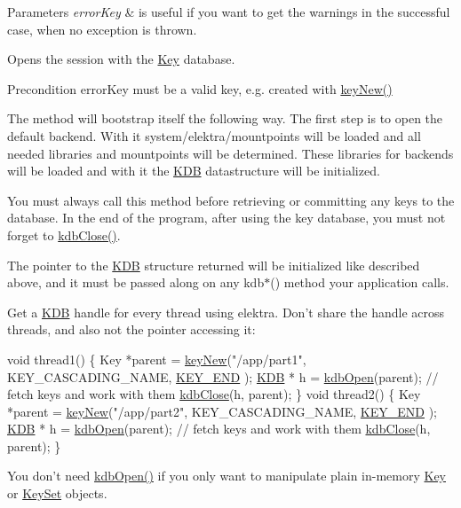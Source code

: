 \begin{DoxyParams}{Parameters}
{\em error\-Key} & is useful if you want to get the warnings in the successful case, when no exception is thrown.\\
\hline
\end{DoxyParams}
Opens the session with the \hyperlink{classkdb_1_1Key}{Key} database.  \begin{DoxyPrecond}{Precondition}
error\-Key must be a valid key, e.\-g. created with \hyperlink{group__key_gad23c65b44bf48d773759e1f9a4d43b89}{key\-New()}
\end{DoxyPrecond}
The method will bootstrap itself the following way. The first step is to open the default backend. With it system/elektra/mountpoints will be loaded and all needed libraries and mountpoints will be determined. These libraries for backends will be loaded and with it the {\ttfamily \hyperlink{classkdb_1_1KDB}{K\-D\-B}} datastructure will be initialized.

You must always call this method before retrieving or committing any keys to the database. In the end of the program, after using the key database, you must not forget to \hyperlink{group__kdb_gadb54dc9fda17ee07deb9444df745c96f}{kdb\-Close()}.

The pointer to the {\ttfamily \hyperlink{classkdb_1_1KDB}{K\-D\-B}} structure returned will be initialized like described above, and it must be passed along on any kdb$\ast$() method your application calls.

Get a {\ttfamily \hyperlink{classkdb_1_1KDB}{K\-D\-B}} handle for every thread using elektra. Don't share the handle across threads, and also not the pointer accessing it\-:


\begin{DoxyCodeInclude}
\textcolor{keywordtype}{void} thread1()
\{
        Key *parent = \hyperlink{group__key_gad23c65b44bf48d773759e1f9a4d43b89}{keyNew}(\textcolor{stringliteral}{"/app/part1"}, KEY\_CASCADING\_NAME, \hyperlink{group__key_gga91fb3178848bd682000958089abbaf40aa8adb6fcb92dec58fb19410eacfdd403}{KEY\_END}
      );
        \hyperlink{classkdb_1_1KDB_a7e0637995ce9f294cdbc6f167df6db40}{KDB} * h = \hyperlink{group__kdb_ga6808defe5870f328dd17910aacbdc6ca}{kdbOpen}(parent);
        \textcolor{comment}{// fetch keys and work with them}
        \hyperlink{group__kdb_gadb54dc9fda17ee07deb9444df745c96f}{kdbClose}(h, parent);
\}
\textcolor{keywordtype}{void} thread2()
\{
        Key *parent = \hyperlink{group__key_gad23c65b44bf48d773759e1f9a4d43b89}{keyNew}(\textcolor{stringliteral}{"/app/part2"}, KEY\_CASCADING\_NAME, \hyperlink{group__key_gga91fb3178848bd682000958089abbaf40aa8adb6fcb92dec58fb19410eacfdd403}{KEY\_END}
      );
        \hyperlink{classkdb_1_1KDB_a7e0637995ce9f294cdbc6f167df6db40}{KDB} * h = \hyperlink{group__kdb_ga6808defe5870f328dd17910aacbdc6ca}{kdbOpen}(parent);
        \textcolor{comment}{// fetch keys and work with them}
        \hyperlink{group__kdb_gadb54dc9fda17ee07deb9444df745c96f}{kdbClose}(h, parent);
\}
\end{DoxyCodeInclude}
 You don't need \hyperlink{group__kdb_ga6808defe5870f328dd17910aacbdc6ca}{kdb\-Open()} if you only want to manipulate plain in-\/memory \hyperlink{classkdb_1_1Key}{Key} or \hyperlink{classkdb_1_1KeySet}{Key\-Set} objects.

